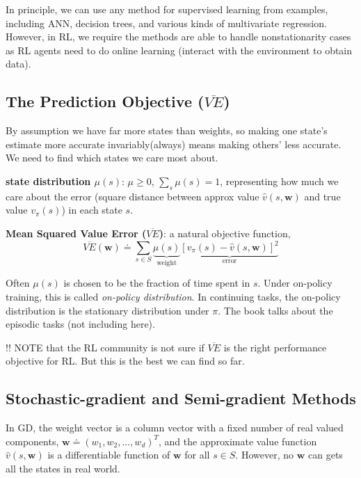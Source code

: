 \documentclass[sutton_barto_notes.tex]{subfiles}
\begin{document}
In principle, we can use any method for supervised learning from examples, including ANN, decision trees, and various kinds of multivariate regression.
However, in RL, we require the methods are able to handle nonstationarity cases as RL agents need to do online learning (interact with the environment to obtain data).

\subsection{The Prediction Objective ($\overline{VE}$)}

By assumption we have far more states than weights, so making one state's estimate more accurate invariably(always) means making others' less accurate. We need to find which states we care most about.

\begin{definition}
\textbf{state distribution $\mu(s)$}: $\mu \geq 0$, $\sum_s \mu(s) = 1$, representing how much we care about the error (square distance between approx value $\hat{v}(s,\bm{w})$ and true value $v_\pi(s)$) in each state $s$.
\end{definition}

\begin{definition}
\textbf{Mean Squared Value Error ($\overline{VE}$)}: a natural objective function,
$$\overline{VE}(\bm{w}) \doteq \sum_{s\in S} \underbrace{\mu(s)}_{\text{weight}} \underbrace{[v_\pi(s) - \hat{v}(s,\bm{w})]^2}_{\text{error}}$$
\end{definition}

Often $\mu(s)$ is chosen to be the fraction of time spent in $s$. Under on-policy training, this is called \textit{on-policy distribution}. In continuing tasks, the on-policy distribution is the stationary distribution under $\pi$. The book talks about the episodic tasks (not including here).

!! NOTE that the RL community is not sure if $\overline{VE}$ is the right performance objective for RL. But this is the best we can find so far.

\subsection{Stochastic-gradient and Semi-gradient Methods}

In GD, the weight vector is a column vector with a fixed number of real valued components, $\bm{w} \doteq (w_1, w_2, ..., w_d)^T $, and the approximate value function $\hat{v}(s,\bm{w})$ is a differentiable function of $\bm{w}$ for all $s \in S$. However, no $\bm{w}$ can gets all the states in real world.
\end{document}
